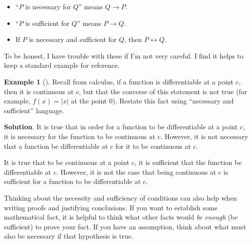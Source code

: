\documentclass[10pt,]{book}
\theoremstyle{plain}
\theoremstyle{definition}
\theoremstyle{definition}
\newtheorem{example}[theorem]{Example}
\theoremstyle{definition}
\theoremstyle{definition}
\numberwithin{equation}{chapter}
\def\iff{\leftrightarrow}
\def\imp{\rightarrow}
\begin{document}
\begin{assemblage}\label{assemblage-21}
\hypertarget{p-1448}{}%
\par
\hypertarget{p-1449}{}%
%
\begin{itemize}[label=\textbullet]
\item{}``\(P\) is necessary for \(Q\)'' means \(Q \imp P\).%
\item{}``\(P\) is sufficient for \(Q\)'' means \(P \imp Q\).%
\item{}\hypertarget{p-1450}{}%
If \(P\) is necessary and sufficient for \(Q\), then \(P \iff Q\).%
\end{itemize}
%
\end{assemblage}
\hypertarget{p-1451}{}%
To be honest, I have trouble with these if I'm not very careful. I find it helps to keep a standard example for reference.%
\begin{example}[]\label{example-38}
\hypertarget{p-1452}{}%
Recall from calculus, if a function is differentiable at a point \(c\), then it is continuous at \(c\), but that the converse of this statement is not true (for example, \(f(x) = |x|\) at the point 0). Restate this fact using ``necessary and sufficient'' language.%
\par\smallskip%
\noindent\textbf{Solution}.\hypertarget{solution-124}{}\quad%
\hypertarget{p-1453}{}%
It is true that in order for a function to be differentiable at a point \(c\), it is necessary for the function to be continuous at \(c\). However, it is not necessary that a function be differentiable at \(c\) for it to be continuous at \(c\).%
\par
\hypertarget{p-1454}{}%
It is true that to be continuous at a point \(c\), it is sufficient that the function be differentiable at \(c\). However, it is not the case that being continuous at \(c\) is sufficient for a function to be differentiable at \(c\).%
\end{example}
\hypertarget{p-1455}{}%
Thinking about the necessity and sufficiency of conditions can also help when writing proofs and justifying conclusions. If you want to establish some mathematical fact, it is helpful to think what other facts would \emph{be enough} (be sufficient) to prove your fact. If you have an assumption, think about what must also be necessary if that hypothesis is true.%
\typeout{************************************************}
\typeout{************************************************}
\end{document}
